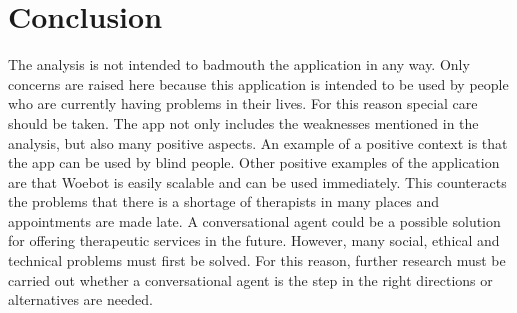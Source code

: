 \section{Conclusion}\label{sec:conclusion}
The analysis is not intended to badmouth the application in any way.
Only concerns are raised here because this application is intended to be used by people who are currently having problems in their lives.
For this reason special care should be taken.
The app not only includes the weaknesses mentioned in the analysis, but also many positive aspects.
An example of a positive context is that the app can be used by blind people.
Other positive examples of the application are that Woebot is easily scalable and can be used immediately.
This counteracts the problems that there is a shortage of therapists in many places and appointments are made late.
A conversational agent could be a possible solution for offering therapeutic services in the future.
However, many social, ethical and technical problems must first be solved.
For this reason, further research must be carried out whether a conversational agent is the step in the right directions or alternatives are needed.
